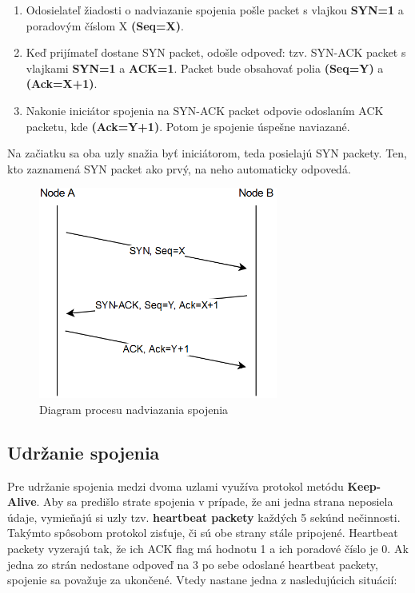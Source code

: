 \documentclass[a4paper,12pt]{article}
\begin{document}
	\begin{enumerate}
	    \item 
		Odosielateľ žiadosti o nadviazanie spojenia pošle packet s vlajkou \textbf{SYN=1} a poradovým číslom X \textbf{(Seq=X)}.
	    \item 
		Keď prijímateľ dostane SYN packet, odošle odpoveď: tzv. SYN-ACK packet s vlajkami \textbf{SYN=1} a \textbf{ACK=1}. Packet bude obsahovať polia \textbf{(Seq=Y)} a \textbf{(Ack=X+1)}.
	    \item 
		Nakonie iniciátor spojenia na SYN-ACK packet odpovie odoslaním ACK packetu, kde \textbf{(Ack=Y+1)}. Potom je spojenie úspešne naviazané.
	\end{enumerate}
	Na začiatku sa oba uzly snažia byť iniciátorom, teda posielajú SYN packety. Ten, kto zaznamená SYN packet ako prvý, na neho automaticky odpovedá.	

	\begin{figure}[h]
		\centering
		\includegraphics[width=0.70\textwidth]{handshake_diagram.png}
		\caption{Diagram procesu nadviazania spojenia}
		\label{fig:handshake_diagram}
	\end{figure}
	

    \subsection{Udržanie spojenia}\label{keepalive}
	Pre udržanie spojenia medzi dvoma uzlami využíva protokol metódu \textbf{Keep-Alive}. Aby sa predišlo strate spojenia v prípade, že ani jedna strana neposiela údaje, vymieňajú si uzly tzv. \textbf{heartbeat packety} každých 5 sekúnd nečinnosti. Takýmto spôsobom protokol zisťuje, či sú obe strany stále pripojené. Heartbeat packety vyzerajú tak, že ich ACK flag má hodnotu 1 a ich poradové číslo je 0. Ak jedna zo strán nedostane odpoveď na 3 po sebe odoslané heartbeat packety, spojenie sa považuje za ukončené. Vtedy nastane jedna z nasledujúcich situácií:
\end{document}
